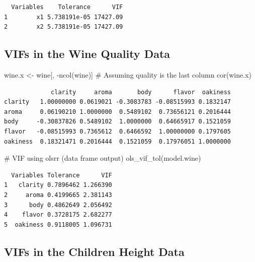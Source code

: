 \documentclass[
  letterpaper,
  DIV=11,
  numbers=noendperiod]{scrreprt}
\newenvironment{Shaded}{\begin{snugshade}}{\end{snugshade}}
\newcommand{\CommentTok}[1]{\textcolor[rgb]{0.37,0.37,0.37}{#1}}
\newcommand{\FunctionTok}[1]{\textcolor[rgb]{0.28,0.35,0.67}{#1}}
\newcommand{\NormalTok}[1]{\textcolor[rgb]{0.00,0.23,0.31}{#1}}
\newcommand{\OtherTok}[1]{\textcolor[rgb]{0.00,0.23,0.31}{#1}}
\newcommand{\SpecialCharTok}[1]{\textcolor[rgb]{0.37,0.37,0.37}{#1}}
\begin{document}
\begin{verbatim}
  Variables    Tolerance      VIF
1        x1 5.738191e-05 17427.09
2        x2 5.738191e-05 17427.09
\end{verbatim}

\subsection{VIFs in the Wine Quality
Data}\label{vifs-in-the-wine-quality-data}

\begin{Shaded}
\begin{Highlighting}[]
\NormalTok{wine.x }\OtherTok{\textless{}{-}}\NormalTok{ wine[, }\SpecialCharTok{{-}}\FunctionTok{ncol}\NormalTok{(wine)] }\CommentTok{\# Assuming quality is the last column}
\FunctionTok{cor}\NormalTok{(wine.x)}
\end{Highlighting}
\end{Shaded}

\begin{verbatim}
             clarity     aroma       body      flavor  oakiness
clarity   1.00000000 0.0619021 -0.3083783 -0.08515993 0.1832147
aroma     0.06190210 1.0000000  0.5489102  0.73656121 0.2016444
body     -0.30837826 0.5489102  1.0000000  0.64665917 0.1521059
flavor   -0.08515993 0.7365612  0.6466592  1.00000000 0.1797605
oakiness  0.18321471 0.2016444  0.1521059  0.17976051 1.0000000
\end{verbatim}

\begin{Shaded}
\begin{Highlighting}[]
\CommentTok{\# VIF using olsrr (data frame output)}
\FunctionTok{ols\_vif\_tol}\NormalTok{(model.wine)}
\end{Highlighting}
\end{Shaded}

\begin{verbatim}
  Variables Tolerance      VIF
1   clarity 0.7896462 1.266390
2     aroma 0.4199665 2.381143
3      body 0.4862649 2.056492
4    flavor 0.3728175 2.682277
5  oakiness 0.9118005 1.096731
\end{verbatim}

\subsection{VIFs in the Children Height
Data}\label{vifs-in-the-children-height-data}
\end{document}

